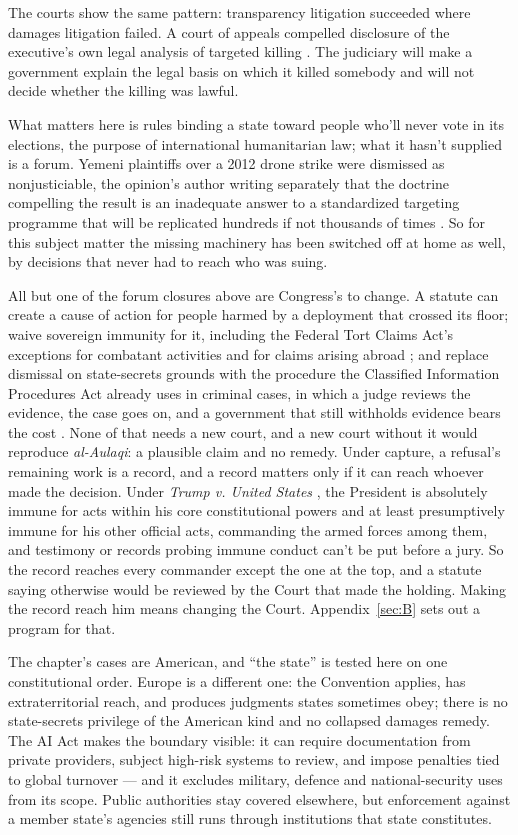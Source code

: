 The courts show the same pattern: transparency litigation succeeded where damages litigation failed. A court of appeals compelled disclosure of the executive's own legal analysis of targeted killing \autocite{nytimes2014olc}. The judiciary will make a government explain the legal basis on which it killed somebody and will not decide whether the killing was lawful.

What matters here is rules binding a state toward people who'll never vote in its elections, the purpose of international humanitarian law; what it hasn't supplied is a forum. Yemeni plaintiffs over a 2012 drone strike were dismissed as nonjusticiable, the opinion's author writing separately that the doctrine compelling the result is an inadequate answer to a standardized targeting programme that will be replicated hundreds if not thousands of times \autocite{binalijaber2017}. So for this subject matter the missing machinery has been switched off at home as well, by decisions that never had to reach who was suing.

All but one of the forum closures above are Congress's to change. A statute can create a cause of action for people harmed by a deployment that crossed its floor; waive sovereign immunity for it, including the Federal Tort Claims Act's exceptions for combatant activities and for claims arising abroad \autocite{usc2680}; and replace dismissal on state-secrets grounds with the procedure the Classified Information Procedures Act already uses in criminal cases, in which a judge reviews the evidence, the case goes on, and a government that still withholds evidence bears the cost \autocite{cipa1980}. None of that needs a new court, and a new court without it would reproduce \emph{al-Aulaqi}: a plausible claim and no remedy. Under capture, a refusal's remaining work is a record, and a record matters only if it can reach whoever made the decision. Under \emph{Trump v. United States} \autocite{trump2024immunity}, the President is absolutely immune for acts within his core constitutional powers and at least presumptively immune for his other official acts, commanding the armed forces among them, and testimony or records probing immune conduct can't be put before a jury. So the record reaches every commander except the one at the top, and a statute saying otherwise would be reviewed by the Court that made the holding. Making the record reach him means changing the Court. Appendix~\ref{sec:B} sets out a program for that.

The chapter's cases are American, and “the state” is tested here on one constitutional order. Europe is a different one: the Convention applies, has extraterritorial reach, and produces judgments states sometimes obey; there is no state-secrets privilege of the American kind and no collapsed damages remedy. The AI Act makes the boundary visible: it can require documentation from private providers, subject high-risk systems to review, and impose penalties tied to global turnover — and it excludes military, defence and national-security uses from its scope. Public authorities stay covered elsewhere, but enforcement against a member state's agencies still runs through institutions that state constitutes.

